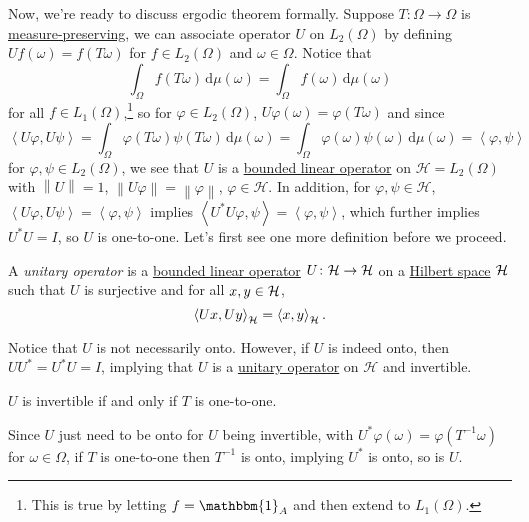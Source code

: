 Now, we're ready to discuss ergodic theorem formally. Suppose \(T\colon \Omega \to \Omega\) is \hyperref[def:measure-preserving]{measure-preserving}, we can associate operator \(U\) on \(L_2(\Omega)\) by defining \(U f(\omega) = f(T \omega)\) for \(f\in L_2(\Omega )\) and \(\omega \in \Omega\). Notice that
\[
	\int_\Omega f(T \omega) \,\mathrm{d} \mu(\omega) = \int_\Omega f(\omega) \,\mathrm{d} \mu(\omega)
\]
for all \(f\in L_1(\Omega )\),\footnote{This is true by letting \(f = \mathbbm{1}_A\) and then extend to \(L_1(\Omega)\).} so for \(\varphi \in L_2(\Omega)\), \(U \varphi(\omega) = \varphi (T \omega)\) and since
\[
	\left\langle U \varphi, U \psi \right\rangle
	= \int_\Omega \varphi(T \omega) \psi(T \omega) \,\mathrm{d} \mu(\omega)
	= \int_\Omega \varphi(\omega) \psi(\omega) \,\mathrm{d} \mu(\omega)
	= \left\langle \varphi, \psi \right\rangle
\]
for \(\varphi,\psi \in L_2(\Omega)\), we see that \(U\) is a \hyperref[def:bounded-linear-op]{bounded linear operator} on \(\mathcal{H} = L_2(\Omega)\) with \(\left\lVert U\right\rVert  = 1\), \(\left\lVert U\varphi \right\rVert = \left\lVert \varphi \right\rVert\), \(\varphi \in \mathcal{H}\). In addition, for \(\varphi,\psi \in \mathcal{H}\), \(\left\langle U \varphi, U \psi \right\rangle = \left\langle \varphi, \psi \right\rangle\) implies \(\left\langle U^{\ast} U \varphi, \psi \right\rangle = \left\langle \varphi, \psi \right\rangle\), which further implies \(U^{\ast} U = I\), so \(U\) is one-to-one. Let's first see one more definition before we proceed.

\begin{definition}\label{def:unitary-op}
	A \emph{unitary operator} is a \hyperref[def:bounded-linear-op]{bounded linear operator} \(U\colon \mathcal{\MakeUppercase{h}} \to \mathcal{\MakeUppercase{h}} \) on a \hyperref[def:Hilbert-space]{Hilbert space} \(\mathcal{\MakeUppercase{h}} \) such that \(U\) is surjective and for all \(x, y\in \mathcal{\MakeUppercase{h}} \),
	\[
		\left\langle Ux, Uy \right\rangle _{\mathcal{\MakeUppercase{h}} } = \left\langle x, y \right\rangle _{\mathcal{\MakeUppercase{h}} }.
	\]
\end{definition}

Notice that \(U\) is not necessarily onto. However, if \(U\) is indeed onto, then \(UU^{\ast} = U^{\ast} U = I\), implying that \(U\) is a \hyperref[def:unitary-op]{unitary operator} on \(\mathcal{H}\) and invertible.

\begin{note}
	\(U\) is invertible if and only if \(T\) is one-to-one.
\end{note}
\begin{explanation}
	Since \(U\) just need to be onto for \(U\) being invertible, with \(U^{\ast} \varphi(\omega) = \varphi(T^{-1} \omega)\) for \(\omega \in \Omega\), if \(T\) is one-to-one then \(T^{-1} \) is onto, implying \(U^{\ast} \) is onto, so is \(U\).
\end{explanation}

